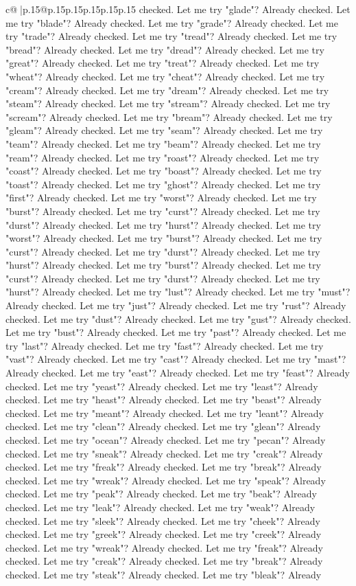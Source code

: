 \documentclass{article}
\begin{document}
{\begin{supertabular}{c@{$\;$}|p{.15\linewidth}@{}p{.15\linewidth}p{.15\linewidth}p{.15\linewidth}p{.15\linewidth}p{.15\linewidth}}
{{{checked. Let me try "glade"? Already checked. Let me try "blade"? Already checked. Let me try "grade"? Already checked. Let me try "trade"? Already checked. Let me try "tread"? Already checked. Let me try "bread"? Already checked. Let me try "dread"? Already checked. Let me try "great"? Already checked. Let me try "treat"? Already checked. Let me try "wheat"? Already checked. Let me try "cheat"? Already checked. Let me try "cream"? Already checked. Let me try "dream"? Already checked. Let me try "steam"? Already checked. Let me try "stream"? Already checked. Let me try "scream"? Already checked. Let me try "bream"? Already checked. Let me try "gleam"? Already checked. Let me try "seam"? Already checked. Let me try "team"? Already checked. Let me try "beam"? Already checked. Let me try "ream"? Already checked. Let me try "roast"? Already checked. Let me try "coast"? Already checked. Let me try "boast"? Already checked. Let me try "toast"? Already checked. Let me try "ghost"? Already checked. Let me try "first"? Already checked. Let me try "worst"? Already checked. Let me try "burst"? Already checked. Let me try "curst"? Already checked. Let me try "durst"? Already checked. Let me try "hurst"? Already checked. Let me try "worst"? Already checked. Let me try "burst"? Already checked. Let me try "curst"? Already checked. Let me try "durst"? Already checked. Let me try "hurst"? Already checked. Let me try "burst"? Already checked. Let me try "curst"? Already checked. Let me try "durst"? Already checked. Let me try "hurst"? Already checked. Let me try "lust"? Already checked. Let me try "must"? Already checked. Let me try "just"? Already checked. Let me try "rust"? Already checked. Let me try "dust"? Already checked. Let me try "gust"? Already checked. Let me try "bust"? Already checked. Let me try "past"? Already checked. Let me try "last"? Already checked. Let me try "fast"? Already checked. Let me try "vast"? Already checked. Let me try "cast"? Already checked. Let me try "mast"? Already checked. Let me try "east"? Already checked. Let me try "feast"? Already checked. Let me try "yeast"? Already checked. Let me try "least"? Already checked. Let me try "heast"? Already checked. Let me try "beast"? Already checked. Let me try "meant"? Already checked. Let me try "leant"? Already checked. Let me try "clean"? Already checked. Let me try "glean"? Already checked. Let me try "ocean"? Already checked. Let me try "pecan"? Already checked. Let me try "sneak"? Already checked. Let me try "creak"? Already checked. Let me try "freak"? Already checked. Let me try "break"? Already checked. Let me try "wreak"? Already checked. Let me try "speak"? Already checked. Let me try "peak"? Already checked. Let me try "beak"? Already checked. Let me try "leak"? Already checked. Let me try "weak"? Already checked. Let me try "sleek"? Already checked. Let me try "cheek"? Already checked. Let me try "greek"? Already checked. Let me try "creek"? Already checked. Let me try "wreak"? Already checked. Let me try "freak"? Already checked. Let me try "creak"? Already checked. Let me try "break"? Already checked. Let me try "steak"? Already checked. Let me try "bleak"? Already }}}
\end{supertabular}}
\end{document}
